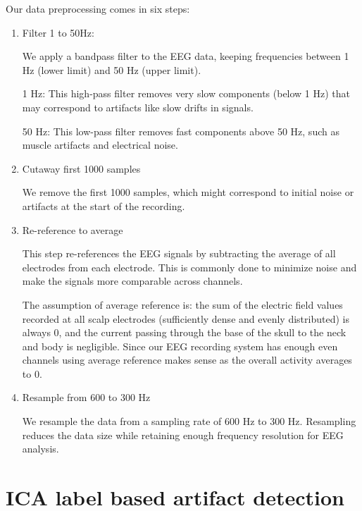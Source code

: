 \documentclass[12pt,a4paper,titlepage,openany]{report}
\begin{document}
Our data preprocessing comes in six steps:
\begin{enumerate}
    \item Filter 1 to 50Hz:
    
    We apply a bandpass filter to the EEG data, keeping frequencies between 1 Hz (lower limit) and 50 Hz (upper limit).

    1 Hz: This high-pass filter removes very slow components (below 1 Hz) that may correspond to artifacts like slow drifts in signals.

    50 Hz: This low-pass filter removes fast components above 50 Hz, such as muscle artifacts and electrical noise.

    \item Cutaway first 1000 samples

    We remove the first 1000 samples, which might correspond to initial noise or artifacts at the start of the recording. 

    \item Re-reference to average

    This step re-references the EEG signals by subtracting the average of all electrodes from each electrode. This is commonly done to minimize noise and make the signals more comparable across channels.

    The assumption of average reference is: the sum of the electric field values recorded at all scalp electrodes (sufficiently dense and evenly distributed) is always 0, and the current passing through the base of the skull to the neck and body is negligible. 
    Since our EEG recording system has enough even channels using average reference makes sense as the overall activity averages to 0.

    \item Resample from 600 to 300 Hz

    We resample the data from a sampling rate of 600 Hz to 300 Hz. Resampling reduces the data size while retaining enough frequency resolution for EEG analysis.

\end{enumerate}

\section{ICA label based artifact detection}
\end{document}
